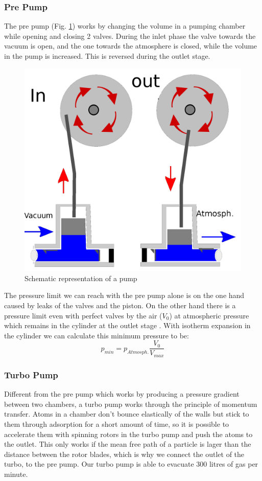 \documentclass[]{article}
\begin{document}
\subsubsection{Pre Pump}
The pre pump (Fig. \ref{fig:prepump}) works by changing the volume in a pumping chamber while opening and closing 2 valves. During the inlet phase the valve towards the vacuum is open, and the one towards the atmosphere is closed, while the volume in the pump is increased. This is reversed during the outlet stage.

\begin{figure}[h]
	
	\centering
	\includegraphics[width=0.5\linewidth]{Bilder/pump}
	
	\caption{Schematic representation of a pump}
	\label{fig:prepump}
\end{figure}

The pressure limit we can reach with the pre pump alone is on the one hand caused by leaks of the valves and the piston. On the other hand there is a pressure limit even with perfect valves by the air ($V_{0} $) at atmospheric pressure which remains in the cylinder at the outlet stage . With isotherm expansion in the cylinder we can calculate this minimum pressure to be: \[ p_{min}=p_{Atmosph.}\frac{V_{0}}{V_{max}} \]

\subsubsection{Turbo Pump}
Different from the pre pump which works by producing a pressure gradient between two chambers, a turbo pump works through the principle of momentum transfer. Atoms in a chamber don't bounce elastically of the walls but stick to them through adsorption for a short amount of time, so it is possible to accelerate them with spinning rotors in the turbo pump and push the atoms to the outlet. This only works if the mean free path of a particle is lager than the distance between the rotor blades, which is why we connect the outlet of the turbo, to the pre pump. Our turbo pump is able to evacuate 300 litres of gas per minute.
\end{document}
